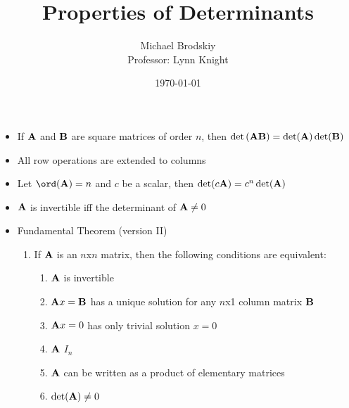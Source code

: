\documentclass[12pt]{article}
\title{Properties of Determinants}
\date{\today}
\author{Michael Brodskiy\\ \small Professor: Lynn Knight}
\begin{document}
\maketitle

\begin{itemize}

  \item If $\bold{A}$ and $\bold{B}$ are square matrices of order $n$, then $\det\left( \bold{AB} \right)=\det(\bold{A})\det(\bold{B})$

  \item All row operations are extended to columns

  \item Let $\ord(\bold{A})=n$ and $c$ be a scalar, then $\det(c\bold{A})=c^n\det(\bold{A})$

  \item $\bold{A}$ is invertible iff the determinant of $\bold{A}\neq0$

  \item Fundamental Theorem (version II)

    \begin{enumerate}

      \item If $\bold{A}$ is an $n$x$n$ matrix, then the following conditions are equivalent:
        \begin{enumerate}

          \item $\bold{A}$ is invertible

          \item $\bold{A}x=\bold{B}$ has a unique solution for any $n$x1 column matrix $\bold{B}$

          \item $\bold{A}x=0$ has only trivial solution $x=0$

          \item $\bold{A}$  $I_n$

          \item $\bold{A}$ can be written as a product of elementary matrices

          \item $\det(\bold{A})\neq0$

        \end{enumerate}

    \end{enumerate}

\end{itemize}
\end{document}
